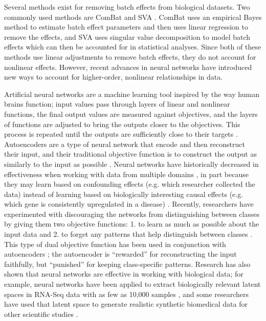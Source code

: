 \documentclass[notitlepage]{article}
\begin{document}
Several methods exist for removing batch effects from biological datasets.
Two commonly used methods are ComBat \citep{johnson_adjusting_2007} and SVA \citep{leek_capturing_2007}.
ComBat uses an empirical Bayes method to estimate batch effect parameters and then uses linear regression to remove the effects, and SVA uses singular value decomposition to model batch effects which can then be accounted for in statistical analyses.
Since both of these methods use linear adjustments to remove batch effects, they do not account for nonlinear effects.
However, recent advances in neural networks have introduced new ways to account for higher-order, nonlinear relationships in data.

Artificial neural networks are a machine learning tool inspired by the way human brains function; input values pass through layers of linear and nonlinear functions, the final output values are measured against objectives, and the layers of functions are adjusted to bring the outputs closer to the objectives.
This process is repeated until the outputs are sufficiently close to their targets \citep{schmidhuber_deep_2015}.
Autoencoders are a type of neural network that encode and then reconstruct their input, and their traditional objective function is to construct the output as similarly to the input as possible \citep{hinton_reducing_2006}.
Neural networks have historically decreased in effectiveness when working with data from multiple domains \citep{ganin_domain-adversarial_2015}, in part because they may learn based on confounding effects (e.g. which researcher collected the data) instead of learning based on biologically interesting causal effects (e.g. which gene is consistently upregulated in a disease) \citep{louizos_causal_2017-2}.
Recently, researchers have experimented with discouraging the networks from distinguishing between classes by giving them two objective functions:
1. to learn as much as possible about the input data and
2. to forget any patterns that help distinguish between classes \citep{ganin_domain-adversarial_2015,tzeng_deep_2014-2}.
This type of dual objective function has been used in conjunction with autoencoders \citep{louizos_variational_2015}; the autoencoder is ``rewarded'' for reconstructing the input faithfully, but ``punished'' for keeping class-specific patterns.
Research has also shown that neural networks are effective in working with biological data; for example, neural networks have been applied to extract biologically relevant latent spaces in RNA-Seq data with as few as 10,000 samples \citep{way_extracting_2017}, and some researchers have used that latent space to generate realistic synthetic biomedical data for other scientific studies \citep{beaulieu-jones_privacy-preserving_2017}.
\end{document}
